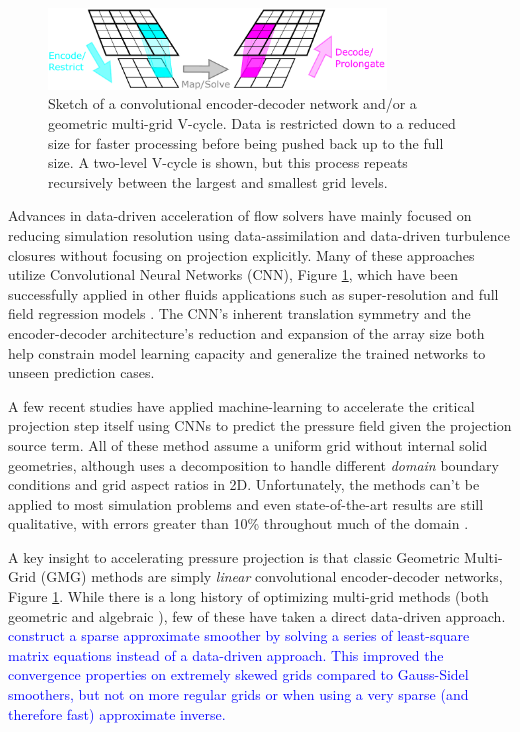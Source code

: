 \documentclass[]{elsarticle}
\begin{document}
\begin{figure}
    \centering
    \includegraphics[width=0.8\textwidth]{figures/drawing}
    \caption{Sketch of a convolutional encoder-decoder network and/or a geometric multi-grid V-cycle. Data is restricted down to a reduced size for faster processing before being pushed back up to the full size. A two-level V-cycle is shown, but this process repeats recursively between the largest and smallest grid levels.}
    \label{fig:multigrid}
\end{figure}

Advances in data-driven acceleration of flow solvers have mainly focused on reducing simulation resolution using data-assimilation and data-driven turbulence closures \cite{asch2016data,BECK2019108910,maulik_san_rasheed_vedula_2019,ling_kurzawski_templeton_2016,font2021deep} without focusing on projection explicitly. Many of these approaches utilize Convolutional Neural Networks (CNN), Figure \ref{fig:multigrid}, which have been successfully applied in other fluids applications such as super-resolution \cite{liu2020deep} and full field regression models \cite{bhatnagar2019prediction}. The CNN's inherent translation symmetry and the encoder-decoder architecture's reduction and expansion of the array size both help constrain model learning capacity and generalize the trained networks to unseen prediction cases. 

A few recent studies have applied machine-learning to accelerate the critical projection step itself \cite{ozbay2021poisson,Xiao2020,ajuria2020} using CNNs to predict the pressure field given the projection source term. All of these method assume a uniform grid without internal solid geometries, although \cite{ozbay2021poisson} uses a decomposition to handle different \textit{domain} boundary conditions and grid aspect ratios in 2D. Unfortunately, the methods can't be applied to most simulation problems and even state-of-the-art results are still qualitative, with errors greater than 10\% throughout much of the domain \cite{ozbay2021poisson}. 

A key insight to accelerating pressure projection is that classic Geometric Multi-Grid (GMG) methods \cite{briggs2000multigrid} are simply \textit{linear} convolutional encoder-decoder networks, Figure \ref{fig:multigrid}. While there is a long history of optimizing multi-grid methods (both geometric \cite{tang2000sparse} and algebraic \cite{brezina2006adaptive}), few of these have taken a direct data-driven approach. \textcolor{blue}{\cite{tang2000sparse} construct a sparse approximate smoother by solving a series of least-square matrix equations instead of a data-driven approach. This improved the convergence properties on extremely skewed grids compared to Gauss-Sidel smoothers, but not on more regular grids or when using a very sparse (and therefore fast) approximate inverse.} 
\end{document}
